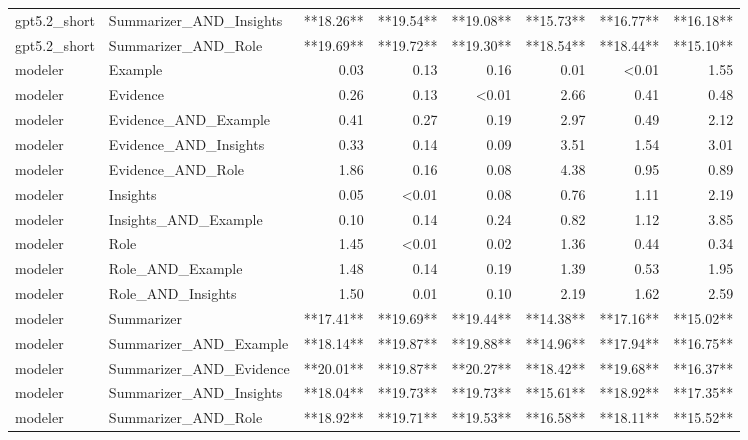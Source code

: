 \begin{tabular}{llrrrrrr}
gpt5.2_short & Summarizer_AND_Insights & **18.26** & **19.54** & **19.08** & **15.73** & **16.77** & **16.18** \\
gpt5.2_short & Summarizer_AND_Role & **19.69** & **19.72** & **19.30** & **18.54** & **18.44** & **15.10** \\
modeler & Example & 0.03 & 0.13 & 0.16 & 0.01 & <0.01 & 1.55 \\
modeler & Evidence & 0.26 & 0.13 & <0.01 & 2.66 & 0.41 & 0.48 \\
modeler & Evidence_AND_Example & 0.41 & 0.27 & 0.19 & 2.97 & 0.49 & 2.12 \\
modeler & Evidence_AND_Insights & 0.33 & 0.14 & 0.09 & 3.51 & 1.54 & 3.01 \\
modeler & Evidence_AND_Role & 1.86 & 0.16 & 0.08 & 4.38 & 0.95 & 0.89 \\
modeler & Insights & 0.05 & <0.01 & 0.08 & 0.76 & 1.11 & 2.19 \\
modeler & Insights_AND_Example & 0.10 & 0.14 & 0.24 & 0.82 & 1.12 & 3.85 \\
modeler & Role & 1.45 & <0.01 & 0.02 & 1.36 & 0.44 & 0.34 \\
modeler & Role_AND_Example & 1.48 & 0.14 & 0.19 & 1.39 & 0.53 & 1.95 \\
modeler & Role_AND_Insights & 1.50 & 0.01 & 0.10 & 2.19 & 1.62 & 2.59 \\
modeler & Summarizer & **17.41** & **19.69** & **19.44** & **14.38** & **17.16** & **15.02** \\
modeler & Summarizer_AND_Example & **18.14** & **19.87** & **19.88** & **14.96** & **17.94** & **16.75** \\
modeler & Summarizer_AND_Evidence & **20.01** & **19.87** & **20.27** & **18.42** & **19.68** & **16.37** \\
modeler & Summarizer_AND_Insights & **18.04** & **19.73** & **19.73** & **15.61** & **18.92** & **17.35** \\
modeler & Summarizer_AND_Role & **18.92** & **19.71** & **19.53** & **16.58** & **18.11** & **15.52** \\
\bottomrule
\end{tabular}
